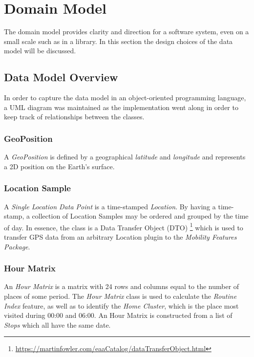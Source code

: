 \section{Domain Model}
The domain model provides clarity and direction for a software system, even on a small scale such as in a library. In this section the design choices of the data model will be discussed.

\subsection{Data Model Overview}
In order to capture the data model in an object-oriented programming language, a UML diagram was maintained as the implementation went along in order to keep track of relationships between the classes. 

\subsubsection*{GeoPosition}
A \textit{GeoPosition} is defined by a geographical \textit{latitude} and \textit{longitude} and represents a 2D position on the Earth's surface.

\subsubsection*{Location Sample}
A \textit{Single Location Data Point} is a time-stamped \textit{Location}. By having a time-stamp, a collection of Location Samples may be ordered and grouped by the time of day. In essence, the class is a Data Transfer Object (DTO) \footnote{\url{https://martinfowler.com/eaaCatalog/dataTransferObject.html}} which is used to transfer GPS data from an arbitrary Location plugin to the \textit{Mobility Features Package}.

\subsubsection*{Hour Matrix}
An \textit{Hour Matrix} is a matrix with 24 rows and columns equal to the number of places of some period. The \textit{Hour Matrix} class is used to calculate the \textit{Routine Index} feature, as well as to identify the \textit{Home Cluster}, which is the place most visited during 00:00 and 06:00. An Hour Matrix is constructed from a list of \textit{Stops} which all have the same date.

